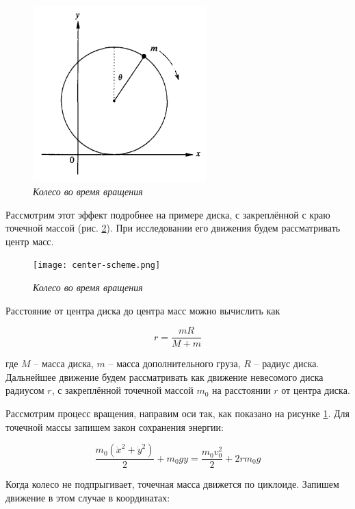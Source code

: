 \documentclass[a4paper,12pt]{article}
\begin{document}
\begin{figure}[h!]
        \centering
	\includegraphics[width=0.6\textwidth]{roll-scheme.png}
	\caption{\textit{Колесо во время вращения}}
	\label{roll-scheme}
\end{figure}

Рассмотрим этот эффект подробнее на примере диска, с закреплённой с краю точечной массой (рис. \ref{center-scheme}). При исследовании его движения будем рассматривать центр масс.

\begin{figure}[h!]
        \centering
	\texttt{[image: center-scheme.png]}
	\caption{\textit{Колесо во время вращения}}
	\label{center-scheme}
\end{figure}

Расстояние от центра диска до центра масс можно вычислить как

\begin{equation}
    r = \frac{mR}{M + m}
\end{equation}

где $M$ -- масса диска, $m$ -- масса дополнительного груза, $R$ -- радиус диска. Дальнейшее движение будем рассматривать как движение невесомого диска радиусом $r$, с закреплённой точечной массой $m_0$ на расстоянии $r$ от центра диска.

Рассмотрим процесс вращения, направим оси так, как показано на рисунке \ref{roll-scheme}. Для точечной массы запишем закон сохранения энергии:

\begin{equation}
    \frac{m_0(\dot{x}^2 + \dot{y}^2)}{2} + m_0gy = \frac{m_0 v_{0}^2}{2} + 2r m_0g
\end{equation}

Когда колесо не подпрыгивает, точечная масса движется по циклоиде. Запишем движение в этом случае в координатах:
\end{document}
